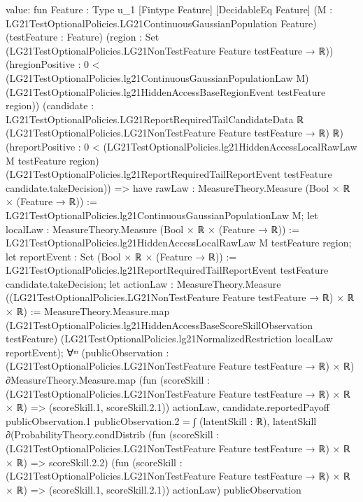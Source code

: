 \documentclass[10pt]{article}
\begin{document}
\begin{ReviewVerbatim}
value:
fun {Feature : Type u_1} [Fintype Feature] [DecidableEq Feature]
    (M : LG21TestOptionalPolicies.LG21ContinuousGaussianPopulation Feature) (testFeature : Feature)
    (region : Set (LG21TestOptionalPolicies.LG21NonTestFeature Feature testFeature → ℝ))
    (hregionPositive :
      0 <
        (LG21TestOptionalPolicies.lg21ContinuousGaussianPopulationLaw M)
          (LG21TestOptionalPolicies.lg21HiddenAccessBaseRegionEvent testFeature region))
    (candidate :
      LG21TestOptionalPolicies.LG21ReportRequiredTailCandidateData ℝ
        (LG21TestOptionalPolicies.LG21NonTestFeature Feature testFeature → ℝ) ℝ)
    (hreportPositive :
      0 <
        (LG21TestOptionalPolicies.lg21HiddenAccessLocalRawLaw M testFeature region)
          (LG21TestOptionalPolicies.lg21ReportRequiredTailReportEvent testFeature candidate.takeDecision)) =>
  have rawLaw : MeasureTheory.Measure (Bool × ℝ × (Feature → ℝ)) :=
    LG21TestOptionalPolicies.lg21ContinuousGaussianPopulationLaw M;
  let localLaw : MeasureTheory.Measure (Bool × ℝ × (Feature → ℝ)) :=
    LG21TestOptionalPolicies.lg21HiddenAccessLocalRawLaw M testFeature region;
  let reportEvent : Set (Bool × ℝ × (Feature → ℝ)) :=
    LG21TestOptionalPolicies.lg21ReportRequiredTailReportEvent testFeature candidate.takeDecision;
  let actionLaw :
    MeasureTheory.Measure ((LG21TestOptionalPolicies.LG21NonTestFeature Feature testFeature → ℝ) × ℝ × ℝ) :=
    MeasureTheory.Measure.map (LG21TestOptionalPolicies.lg21HiddenAccessBaseScoreSkillObservation testFeature)
      (LG21TestOptionalPolicies.lg21NormalizedRestriction localLaw reportEvent);
  ∀ᵐ (publicObservation :
    (LG21TestOptionalPolicies.LG21NonTestFeature Feature testFeature → ℝ) ×
      ℝ) ∂MeasureTheory.Measure.map
      (fun (scoreSkill : (LG21TestOptionalPolicies.LG21NonTestFeature Feature testFeature → ℝ) × ℝ × ℝ) =>
        (scoreSkill.1, scoreSkill.2.1))
      actionLaw,
    candidate.reportedPayoff publicObservation.1 publicObservation.2 =
      ∫ (latentSkill : ℝ),
        latentSkill ∂(ProbabilityTheory.condDistrib
            (fun (scoreSkill : (LG21TestOptionalPolicies.LG21NonTestFeature Feature testFeature → ℝ) × ℝ × ℝ) =>
              scoreSkill.2.2)
            (fun (scoreSkill : (LG21TestOptionalPolicies.LG21NonTestFeature Feature testFeature → ℝ) × ℝ × ℝ) =>
              (scoreSkill.1, scoreSkill.2.1))
            actionLaw)
          publicObservation
\end{ReviewVerbatim}
\end{document}
